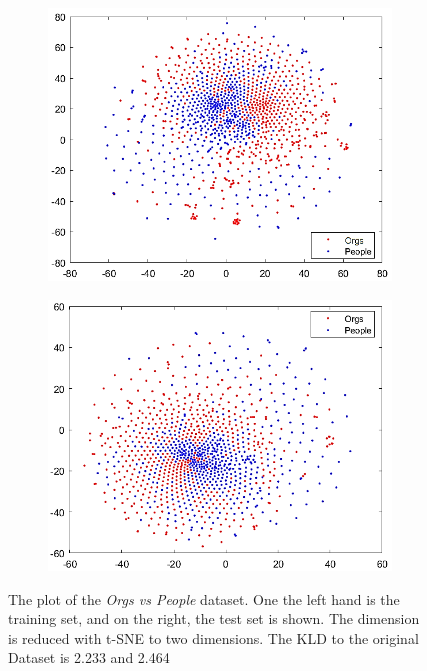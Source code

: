 \begin{figure}
	\centering
	\begin{subfigure}{.5\textwidth}
		\centering
		\includegraphics[width=1\linewidth]{figures/Plot_Train_OP_1.png}
		\label{FigOPSub1}
	\end{subfigure}%
	\begin{subfigure}{.5\textwidth}
		\centering
		\includegraphics[width=1\linewidth]{figures/Plot_Test_OP_1.png}
		\label{FigOPSub2}
	\end{subfigure}
	\caption[Plot of Orgs vs People Dataset]{The plot of the \textit{Orgs vs People} dataset. One the left hand is the training set, and on the right, the test set is shown. The dimension is reduced with t-SNE to two dimensions. The \acs{KLD} to the original Dataset is 2.233 and 2.464 	\label{FigOrgVsPeoplePlot}}
\end{figure}

